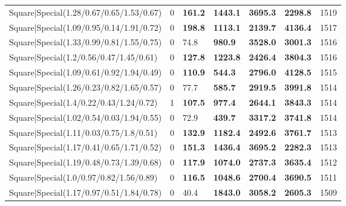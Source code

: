 \begin{tabular}{lrllllr}
 Square|Special(1.28/0.67/0.65/1.53/0.67)                      &             0   & \textbf{161.2} & \textbf{1443.1} & \textbf{3695.3} & \textbf{2298.8} &         1519 \\
 Square|Special(1.09/0.95/0.14/1.91/0.72)                      &             0   & \textbf{198.8} & \textbf{1113.1} & \textbf{2139.7} & \textbf{4136.4} &         1517 \\
 Square|Special(1.33/0.99/0.81/1.55/0.75)                      &             0   & 74.8           & \textbf{980.9}  & \textbf{3528.0} & \textbf{3001.3} &         1516 \\
 Square|Special(1.2/0.56/0.47/1.45/0.61)                       &             0   & \textbf{127.8} & \textbf{1223.8} & \textbf{2426.4} & \textbf{3804.3} &         1516 \\
 Square|Special(1.09/0.61/0.92/1.94/0.49)                      &             0   & \textbf{110.9} & \textbf{544.3}  & \textbf{2796.0} & \textbf{4128.5} &         1515 \\
 Square|Special(1.26/0.23/0.82/1.65/0.57)                      &             0   & 77.7           & \textbf{585.7}  & \textbf{2919.5} & \textbf{3991.8} &         1514 \\
 Square|Special(1.4/0.22/0.43/1.24/0.72)                       &             1   & \textbf{107.5} & \textbf{977.4}  & \textbf{2644.1} & \textbf{3843.3} &         1514 \\
 Square|Special(1.02/0.54/0.03/1.94/0.55)                      &             0   & 72.9           & \textbf{439.7}  & \textbf{3317.2} & \textbf{3741.8} &         1514 \\
 Square|Special(1.11/0.03/0.75/1.8/0.51)                       &             0   & \textbf{132.9} & \textbf{1182.4} & \textbf{2492.6} & \textbf{3761.7} &         1513 \\
 Square|Special(1.17/0.41/0.65/1.71/0.52)                      &             0   & \textbf{151.3} & \textbf{1436.4} & \textbf{3695.2} & \textbf{2282.3} &         1513 \\
 Square|Special(1.19/0.48/0.73/1.39/0.68)                      &             0   & \textbf{117.9} & \textbf{1074.0} & \textbf{2737.3} & \textbf{3635.4} &         1512 \\
 Square|Special(1.0/0.97/0.82/1.56/0.89)                       &             0   & \textbf{116.5} & \textbf{1048.6} & \textbf{2700.4} & \textbf{3690.5} &         1511 \\
 Square|Special(1.17/0.97/0.51/1.84/0.78)                      &             0   & 40.4           & \textbf{1843.0} & \textbf{3058.2} & \textbf{2605.3} &         1509 \\

\end{tabular}
